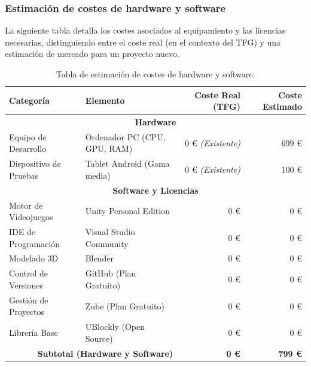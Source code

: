 \subsubsection{Estimación de costes de hardware y software}
La siguiente tabla detalla los costes asociados al equipamiento y las licencias necesarias, distinguiendo entre el coste real (en el contexto del TFG) y una estimación de mercado para un proyecto nuevo.

\begin{table}[H]
	\centering
	\begin{tabularx}{\linewidth}{|l|X|r|r|}
		\hline
		\textbf{Categoría} & \textbf{Elemento} & \textbf{Coste Real (TFG)} & \textbf{Coste Estimado} \\
		\hline
		
		\multicolumn{4}{|c|}{\textbf{Hardware}} \\ \hline
		
		Equipo de Desarrollo & 
		Ordenador PC (CPU, GPU, RAM) & 
		0 € \textit{(Existente)} & 
		699 € \\ \hline
		
		Dispositivo de Pruebas & 
		Tablet Android (Gama media) & 
		0 € \textit{(Existente)} & 
		100 € \\[10pt] 
		
		\hline
		
		\multicolumn{4}{|c|}{\textbf{Software y Licencias}} \\ \hline
		

		Motor de Videojuegos & Unity Personal Edition & 0 € & 0 € \\ \hline
		IDE de Programación & Visual Studio Community & 0 € & 0 € \\ \hline
		Modelado 3D & Blender & 0 € & 0 € \\ \hline
		Control de Versiones & GitHub (Plan Gratuito) & 0 € & 0 € \\ \hline
		Gestión de Proyectos & Zube (Plan Gratuito) & 0 € & 0 € \\ \hline
		Librería Base & UBlockly (Open Source) & 0 € & 0 € \\ \hline
		
		\multicolumn{2}{|r|}{\textbf{Subtotal (Hardware y Software)}} & \textbf{0 €} & \textbf{799 €} \\
		\hline
		
	\end{tabularx}
	\caption{Tabla de estimación de costes de hardware y software.}
	\label{tab:costes}
\end{table}

